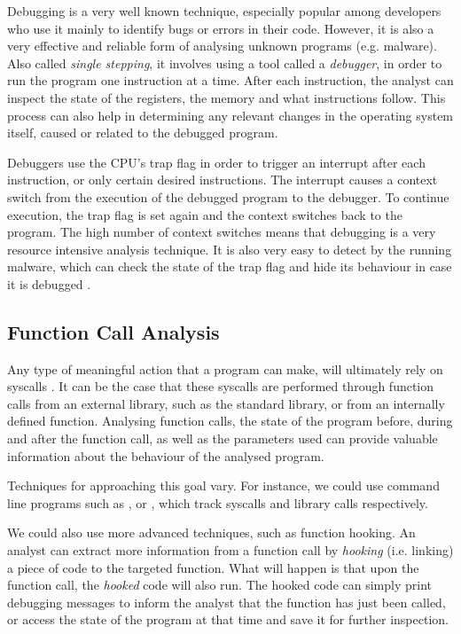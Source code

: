 Debugging is a very well known technique, especially popular among developers who use it mainly to identify bugs or errors in their code. However, it is also a very effective and reliable form of analysing unknown programs (e.g. malware). Also called \emph{single stepping}, it involves using a tool called a \emph{debugger}, in order to run the program one instruction at a time. After each instruction, the analyst can inspect the state of the registers, the memory and what instructions follow. This process can also help in determining any relevant changes in the operating system itself, caused or related to the debugged program.

Debuggers use the CPU's trap flag in order to trigger an interrupt after each instruction, or only certain desired instructions. The interrupt causes a context switch from the execution of the debugged program to the debugger. To continue execution, the trap flag is set again and the context switches back to the program. The high number of context switches means that debugging is a very resource intensive analysis technique. It is also very easy to detect by the running malware, which can check the state of the trap flag and hide its behaviour in case it is debugged \cite{da_survey_2019}.

\subsection{Function Call Analysis}

Any type of meaningful action that a program can make, will ultimately rely on \glspl{syscall} \cite{syscall}. It can be the case that these \glspl{syscall} are performed through function calls from an external library, such as the standard  library, or from an internally defined function. Analysing function calls, the state of the program before, during and after the function call, as well as the parameters used can provide valuable information about the behaviour of the analysed program. 

Techniques for approaching this goal vary. For instance, we could use command line programs such as , or , which track \glspl{syscall} and library calls respectively. 

We could also use more advanced techniques, such as function hooking. An analyst can extract more information from a function call by \emph{hooking} (i.e. linking) a piece of code to the targeted function. What will happen is that upon the function call, the \emph{hooked} code will also run. The hooked code can simply print debugging messages to inform the analyst that the function has just been called, or access the state of the program at that time and save it for further inspection. \cite{da_survey_2019}

